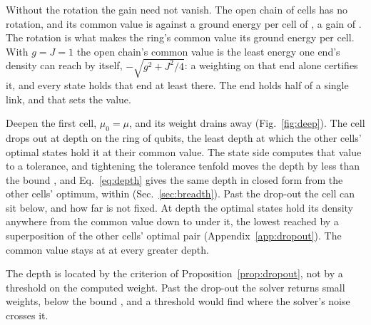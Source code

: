 \documentclass[aps,prd,reprint,superscriptaddress]{revtex4-2}
\begin{document}
Without the rotation the gain need not vanish. The open chain of  cells has no rotation, and its common value is  against a ground energy per cell of , a gain of . The rotation is what makes the ring's common value its ground energy per cell. With $g = J = 1$ the open chain's common value is the least energy one end's density can reach by itself, $-\sqrt{g^2 + J^2/4}$: a weighting on that end alone certifies it, and every state holds that end at least there. The end holds half of a single link, and that sets the value.

Deepen the first cell, $\mu_0 = \mu$, and its weight drains away (Fig.~\ref{fig:deep}). The cell drops out at depth  on the ring of  qubits, the least depth at which the other cells' optimal states hold it at their common value. The state side computes that value to a tolerance, and tightening the tolerance tenfold moves the depth by less than the bound , and Eq.~\eqref{eq:depth} gives the same depth in closed form from the other cells' optimum, within  (Sec.~\ref{sec:breadth}). Past the drop-out the cell can sit below, and how far is not fixed. At depth  the optimal states hold its density anywhere from the common value down to  under it, the lowest reached by a superposition of the other cells' optimal pair (Appendix~\ref{app:dropout}). The common value stays at  at every greater depth.

The depth is located by the criterion of Proposition~\ref{prop:dropout}, not by a threshold on the computed weight. Past the drop-out the solver returns small weights, below the bound , and a threshold would find where the solver's noise crosses it.
\end{document}
